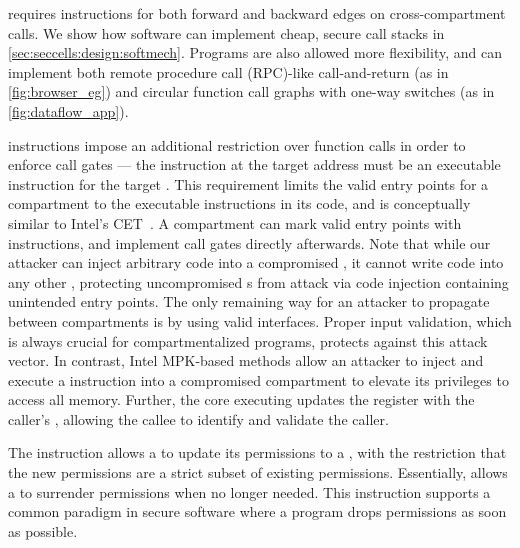 \seccells requires \sdswitch instructions for both
forward and backward edges on cross-compartment calls.
We show how software can implement cheap, secure call
stacks in \autoref{sec:seccells:design:softmech}.
Programs are also allowed more flexibility, and can implement
both remote procedure call (RPC)-like call-and-return (as in
\autoref{fig:browser_eg})
and circular function call graphs with one-way switches 
(as in \autoref{fig:dataflow_app}).

\sdswitch instructions impose an additional
restriction over function calls in order to enforce call gates --- 
the instruction at the target address must be
an executable \sdentry instruction for the target \secdiv.
This requirement limits the valid entry points for a compartment
to the executable \sdentry instructions in its code, 
and is conceptually similar to Intel's CET~\cite{intelCET}.
A compartment can mark valid entry points with \sdentry 
instructions, and implement call gates directly afterwards.
Note that while our attacker can inject arbitrary code into a
compromised \secdiv, it cannot write code into
any other \secdiv, protecting uncompromised \secdiv{}s from 
attack via code injection containing unintended entry points.
The only remaining way for an attacker to propagate between 
compartments is by using valid interfaces.
Proper input validation, which is always crucial for 
compartmentalized programs, protects against this attack vector.
In contrast, Intel MPK-based methods allow an attacker to
inject and execute a  instruction into a compromised 
compartment to elevate its privileges to access all memory.
Further, the core executing \sdswitch updates the \rid
register with the caller's \sid,
allowing the callee to identify and validate the caller.

The \scprot instruction allows a \secdiv to update
its permissions to a \cell, with the restriction that the
new permissions are a strict subset of existing permissions.
Essentially, \scprot allows a \secdiv to surrender permissions
when no longer needed.
This instruction supports a common paradigm in secure software
where a program drops permissions as soon as possible.

